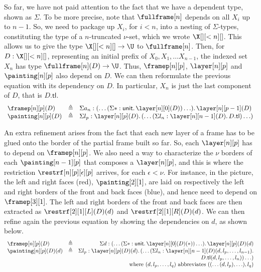 \documentclass{art.cls/art}
\newcommand{\unittype}{\ensuremath{\mathsf{unit}}}
\newcommand{\unitpoint}{\ensuremath{\ast}}
\newcommand{\defeq}{\ensuremath{\triangleq}}
\newcommand{\tl}{\ensuremath{\mathsf{tl}}}
\begin{document}
So far, we have not paid attention to the fact that we have a dependent type, shown as $\Sigma$. To be more precise, note that $\fullframe[n]$ depends on all $X_i$ up to $n - 1$. So, we need to package up $X_i$, for $i < n$, into a nesting of $\Sigma$-types, constituting the type of a $n$-truncated $\nu$-set, which we wrote $\X[][<n][]$. This allows us to give the type $\X[][<n][] \rightarrow \U$ to $\fullframe[n]$. Then, for $D: \X[][<n][]$, representing an initial prefix of $X_0, X_1, \ldots X_{n - 1}$, the indexed set $X_n$ has type $\fullframe[n](D) \rightarrow \U$. Thus, $\framep[n][p]$, $\layer[n][p]$ and $\painting[n][p]$ also depend on $D$. We can then reformulate the previous equation with its dependency on $D$. In particular, $X_n$ is just the last component of $D$, that is $D.\tl$.
\begin{equation*}
  \begin{array}{lll}
    \framep[n][p](D)   & \defeq & \Sigma a_n: (\ldots (\Sigma \unitpoint: \unittype.\, \layer[n][0](D)) \ldots) .\,\layer[n][p - 1](D) \\
    \painting[n][p](D) & \defeq & \Sigma l_p: \layer[n][p](D).\, (\ldots (\Sigma l_n: \layer[n][n - 1](D) .\, D.\tl) \ldots)
  \end{array}
\end{equation*}

An extra refinement arises from the fact that each new layer of a frame has to be glued onto the border of the partial frame built so far. So, each $\layer[n][p]$ has to depend on $\framep[n][p]$. We also need a way to characterize the $\nu$ borders of each $\painting[n-1][p]$ that composes a $\layer[n][p]$, and this is where the restriction $\restrf[n][p][\epsilon][p]$ arrives, for each $\epsilon < \nu$. For instance, in the picture, the left and right faces (red), $\painting[2][1]$, are laid on respectively the left and right borders of the front and back faces (blue), and hence need to depend on $\framep[3][1]$. The left and right borders of the front and back faces are then extracted as $\restrf[2][1][L](D)(d)$ and $\restrf[2][1][R](D)(d)$. We can then refine again the previous equation by showing the dependencies on $d$, as shown below.
\begin{equation*}
  \begin{array}{llr}
    \framep[n][p](D)      & \defeq & \Sigma d: (\ldots (\Sigma \unitpoint: \unittype.\, \layer[n][0](D)(\unitpoint)) \ldots).\, \layer[n][p](D)(d) \\
    \painting[n][p](D)(d) & \defeq & \Sigma l_p: \layer[n][p](D)(d).\, (\ldots (\Sigma l_n: \layer[n][n - 1](D)(d, l_p, \ldots, l_{n - 1}).        \\
                          &        & D.\tl(d, l_p, \ldots, l_n)) \ldots)                                                                           \\
                          &        & \text{where } (d, l_p, \ldots, l_q) \text{ abbreviates } ((\ldots(d, l_p), \ldots), l_q)
  \end{array}
\end{equation*}
\end{document}
